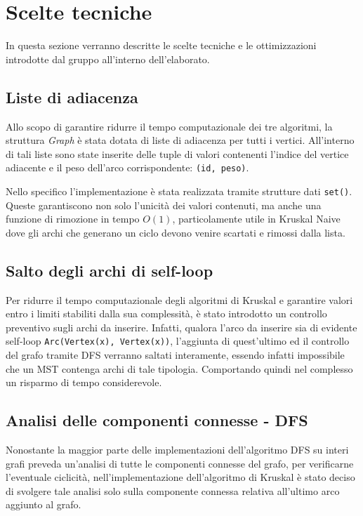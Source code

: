 \section{Scelte tecniche}
In questa sezione verranno descritte le scelte tecniche e le ottimizzazioni introdotte dal gruppo all'interno dell'elaborato.
\subsection{Liste di adiacenza}
Allo scopo di garantire ridurre il tempo computazionale dei tre algoritmi, la struttura \textit{Graph} è stata dotata di liste di adiacenza per tutti i vertici. All'interno di tali liste sono state inserite delle tuple di valori contenenti l'indice del vertice adiacente e il peso dell'arco corrispondente: \texttt{(id, peso)}.

Nello specifico l'implementazione è stata realizzata tramite strutture dati \texttt{set()}. Queste garantiscono non solo l'unicità dei valori contenuti, ma anche una funzione di rimozione in tempo $O(1)$, particolamente utile in Kruskal Naive dove gli archi che generano un ciclo devono venire scartati e rimossi dalla lista.

\subsection{Salto degli archi di self-loop}
Per ridurre il tempo computazionale degli algoritmi di Kruskal e garantire valori entro i limiti stabiliti dalla sua complessità, è stato introdotto un controllo preventivo sugli archi da inserire. Infatti, qualora l'arco da inserire sia di evidente self-loop \texttt{Arc(Vertex(x), Vertex(x))}, l'aggiunta di quest'ultimo ed il controllo del grafo tramite DFS verranno saltati interamente, essendo infatti impossibile che un MST contenga archi di tale tipologia. Comportando quindi nel complesso un risparmo di tempo considerevole.

\subsection{Analisi delle componenti connesse - DFS}
Nonostante la maggior parte delle implementazioni dell'algoritmo DFS su interi grafi preveda un'analisi di tutte le componenti connesse del grafo, per verificarne l'eventuale ciclicità, nell'implementazione dell'algoritmo di Kruskal è stato deciso di svolgere tale analisi solo sulla componente connessa relativa all'ultimo arco aggiunto al grafo.

